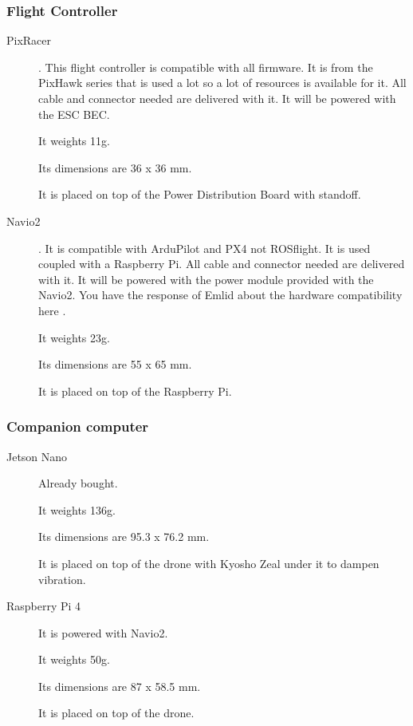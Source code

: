 \subsubsection{Flight Controller}
\begin{description}
    \item[PixRacer] \cite{mrobotics_pixracer}. This flight controller is compatible with all firmware. It is from the PixHawk series that is used a lot so a lot of resources is available for it. All cable and connector needed are delivered with it. It will be powered with the ESC BEC.

          It weights 11g.

          Its dimensions are 36 x 36 mm.

          It is placed on top of the Power Distribution Board with standoff.

    \item[Navio2] \cite{emlid_navio2}. It is compatible with ArduPilot and PX4 not ROSflight. It is used coupled with a Raspberry Pi. All cable and connector needed are delivered with it. It will be powered with the power module \cite{emlid_power_module} provided with the Navio2. You have the response of Emlid about the hardware compatibility here \cite{emlid_rpi_compatibility}.

          It weights 23g.

          Its dimensions are 55 x 65 mm.

          It is placed on top of the Raspberry Pi.
\end{description}

\subsubsection{Companion computer}

\begin{description}
    \item[Jetson Nano] Already bought.

          It weights 136g.

          Its dimensions are 95.3 x 76.2 mm.

          It is placed on top of the drone with Kyosho Zeal under it to dampen vibration.

    \item[Raspberry Pi 4] It is powered with Navio2.

          It weights 50g.

          Its dimensions are 87 x 58.5 mm.

          It is placed on top of the drone.
\end{description}

